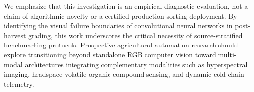 We emphasize that this investigation is an empirical diagnostic evaluation, not a claim of algorithmic novelty or a certified production sorting deployment. By identifying the visual failure boundaries of convolutional neural networks in post-harvest grading, this work underscores the critical necessity of source-stratified benchmarking protocols. Prospective agricultural automation research should explore transitioning beyond standalone RGB computer vision toward multi-modal architectures integrating complementary modalities such as hyperspectral imaging, headspace volatile organic compound sensing, and dynamic cold-chain telemetry.
